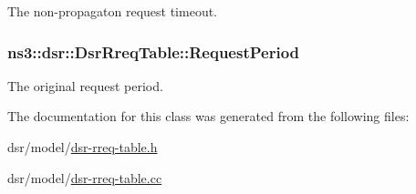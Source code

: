 The non-\/propagaton request timeout. 

\subsubsection[{\texorpdfstring{Request\+Period}{RequestPeriod}}]{ ns3\+::dsr\+::\+Dsr\+Rreq\+Table\+::\+Request\+Period\hspace{0.3cm}{\ttfamily [private]}}\hypertarget{classns3_1_1dsr_1_1DsrRreqTable_a96ba8174c060432e6c624d39180240a3}{}\label{classns3_1_1dsr_1_1DsrRreqTable_a96ba8174c060432e6c624d39180240a3}


The original request period. 



The documentation for this class was generated from the following files\+:\begin{DoxyCompactItemize}
\item 
dsr/model/\hyperlink{dsr-rreq-table_8h}{dsr-\/rreq-\/table.\+h}\item 
dsr/model/\hyperlink{dsr-rreq-table_8cc}{dsr-\/rreq-\/table.\+cc}\end{DoxyCompactItemize}
